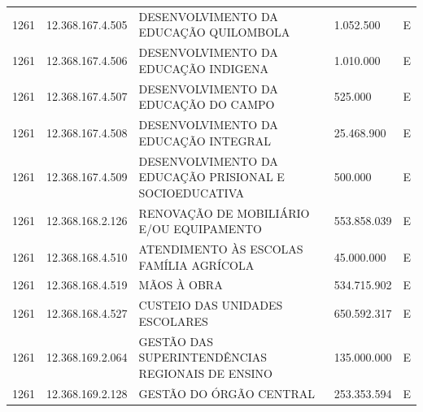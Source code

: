 \documentclass{article}
\begin{document}
\begin{longtable}[c]{m{1cm}|m{2cm}|m{10cm}|m{2cm}|m{1cm}}
\multicolumn{1}{C{1cm}|}{1261} & \multicolumn{1}{C{2cm}|}{12.368.167.4.505} & \multicolumn{1}{L{10cm}|}{DESENVOLVIMENTO DA EDUCAÇÃO QUILOMBOLA} & \multicolumn{1}{R{2cm}|}{1.052.500} & \multicolumn{1}{C{1cm}}{E} \\
\multicolumn{1}{C{1cm}|}{1261} & \multicolumn{1}{C{2cm}|}{12.368.167.4.506} & \multicolumn{1}{L{10cm}|}{DESENVOLVIMENTO DA EDUCAÇÃO INDIGENA} & \multicolumn{1}{R{2cm}|}{1.010.000} & \multicolumn{1}{C{1cm}}{E} \\
\multicolumn{1}{C{1cm}|}{1261} & \multicolumn{1}{C{2cm}|}{12.368.167.4.507} & \multicolumn{1}{L{10cm}|}{DESENVOLVIMENTO DA EDUCAÇÃO DO CAMPO} & \multicolumn{1}{R{2cm}|}{525.000} & \multicolumn{1}{C{1cm}}{E} \\
\multicolumn{1}{C{1cm}|}{1261} & \multicolumn{1}{C{2cm}|}{12.368.167.4.508} & \multicolumn{1}{L{10cm}|}{DESENVOLVIMENTO DA EDUCAÇÃO INTEGRAL} & \multicolumn{1}{R{2cm}|}{25.468.900} & \multicolumn{1}{C{1cm}}{E} \\
\multicolumn{1}{C{1cm}|}{1261} & \multicolumn{1}{C{2cm}|}{12.368.167.4.509} & \multicolumn{1}{L{10cm}|}{DESENVOLVIMENTO DA EDUCAÇÃO PRISIONAL E SOCIOEDUCATIVA} & \multicolumn{1}{R{2cm}|}{500.000} & \multicolumn{1}{C{1cm}}{E} \\
\multicolumn{1}{C{1cm}|}{1261} & \multicolumn{1}{C{2cm}|}{12.368.168.2.126} & \multicolumn{1}{L{10cm}|}{RENOVAÇÃO DE MOBILIÁRIO E/OU EQUIPAMENTO} & \multicolumn{1}{R{2cm}|}{553.858.039} & \multicolumn{1}{C{1cm}}{E} \\
\multicolumn{1}{C{1cm}|}{1261} & \multicolumn{1}{C{2cm}|}{12.368.168.4.510} & \multicolumn{1}{L{10cm}|}{ATENDIMENTO ÀS ESCOLAS FAMÍLIA AGRÍCOLA} & \multicolumn{1}{R{2cm}|}{45.000.000} & \multicolumn{1}{C{1cm}}{E} \\
\multicolumn{1}{C{1cm}|}{1261} & \multicolumn{1}{C{2cm}|}{12.368.168.4.519} & \multicolumn{1}{L{10cm}|}{MÃOS À OBRA} & \multicolumn{1}{R{2cm}|}{534.715.902} & \multicolumn{1}{C{1cm}}{E} \\
\multicolumn{1}{C{1cm}|}{1261} & \multicolumn{1}{C{2cm}|}{12.368.168.4.527} & \multicolumn{1}{L{10cm}|}{CUSTEIO DAS UNIDADES ESCOLARES} & \multicolumn{1}{R{2cm}|}{650.592.317} & \multicolumn{1}{C{1cm}}{E} \\
\multicolumn{1}{C{1cm}|}{1261} & \multicolumn{1}{C{2cm}|}{12.368.169.2.064} & \multicolumn{1}{L{10cm}|}{GESTÃO DAS SUPERINTENDÊNCIAS REGIONAIS DE ENSINO} & \multicolumn{1}{R{2cm}|}{135.000.000} & \multicolumn{1}{C{1cm}}{E} \\
\multicolumn{1}{C{1cm}|}{1261} & \multicolumn{1}{C{2cm}|}{12.368.169.2.128} & \multicolumn{1}{L{10cm}|}{GESTÃO DO ÓRGÃO CENTRAL} & \multicolumn{1}{R{2cm}|}{253.353.594} & \multicolumn{1}{C{1cm}}{E} \\

\end{longtable}
\end{document}
